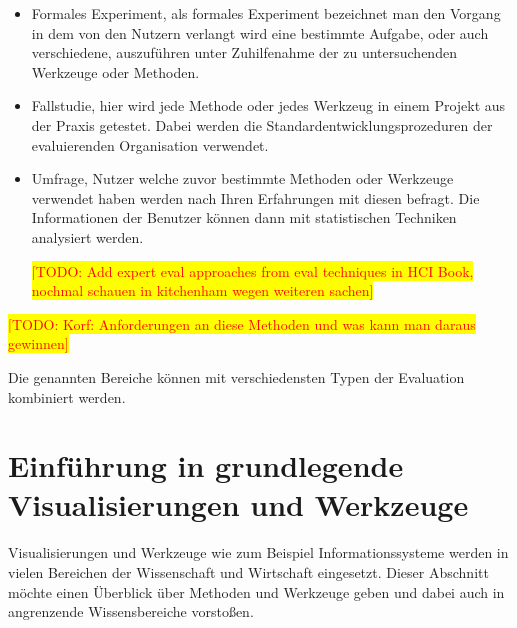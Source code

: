 \documentclass[draft=false
              ,paper=a4
              ,twoside=false
              ,fontsize=11pt
              ,headsepline
              ,BCOR10mm
              ,DIV11
              ]{scrbook}
\newcommand{\TODO}[1]{\colorbox{yellow}{\textcolor{red}{[TODO: #1]}}}
\begin{document}
\begin{itemize}
  \item Formales Experiment, als formales Experiment bezeichnet man den Vorgang in dem von den Nutzern verlangt wird eine bestimmte Aufgabe, oder auch verschiedene, auszuführen unter Zuhilfenahme der zu untersuchenden Werkzeuge oder Methoden. 
  \item Fallstudie, hier wird jede Methode oder jedes Werkzeug in einem Projekt aus der Praxis getestet. Dabei werden die Standardentwicklungsprozeduren der evaluierenden Organisation verwendet.
  \item Umfrage, Nutzer welche zuvor bestimmte Methoden oder Werkzeuge verwendet haben werden nach Ihren Erfahrungen mit diesen befragt. Die Informationen der Benutzer können dann mit statistischen Techniken analysiert werden.

  \TODO{Add expert eval approaches from eval techniques in HCI Book, nochmal schauen in kitchenham wegen weiteren sachen}
\end{itemize}

\TODO{Korf: Anforderungen an diese Methoden und was kann man daraus gewinnen}

Die genannten Bereiche können mit verschiedensten Typen der Evaluation kombiniert werden.
\fi

\section{Einführung in grundlegende Visualisierungen und Werkzeuge} %
\label{sec:visualisierungen_und_werkzeuge}

Visualisierungen und Werkzeuge wie zum Beispiel Informationssysteme werden in vielen Bereichen der Wissenschaft und Wirtschaft eingesetzt. Dieser Abschnitt möchte einen Überblick über Methoden und Werkzeuge geben und dabei auch in angrenzende Wissensbereiche vorstoßen. 
\end{document}
